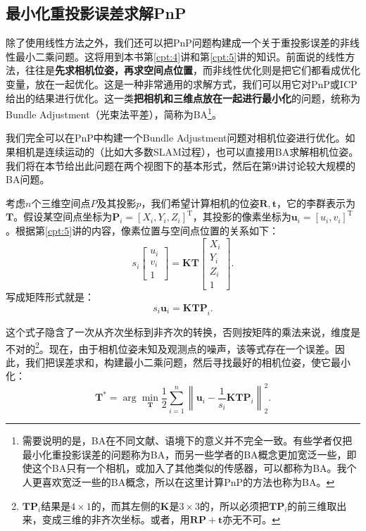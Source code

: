 \subsection{最小化重投影误差求解PnP}
\label{sec:BA-vo1}
除了使用线性方法之外，我们还可以把PnP问题构建成一个关于重投影误差的非线性最小二乘问题。这将用到本书第\ref{cpt:4}讲和第\ref{cpt:5}讲的知识。前面说的线性方法，往往是\textbf{先求相机位姿，再求空间点位置}，而非线性优化则是把它们都看成优化变量，放在一起优化。这是一种非常通用的求解方式，我们可以用它对PnP或ICP给出的结果进行优化。这一类\textbf{把相机和三维点放在一起进行最小化}的问题，统称为Bundle Adjustment（光束法平差），简称为BA\footnote{需要说明的是，BA在不同文献、语境下的意义并不完全一致。有些学者仅把最小化重投影误差的问题称为BA，而另一些学者的BA概念更加宽泛一些，即使这个BA只有一个相机，或加入了其他类似的传感器，可以都称为BA。我个人更喜欢宽泛一些的BA概念，所以在这里计算PnP的方法也称为BA。}。

我们完全可以在PnP中构建一个Bundle Adjustment问题对相机位姿进行优化。如果相机是连续运动的（比如大多数SLAM过程），也可以直接用BA求解相机位姿。我们将在本节给出此问题在两个视图下的基本形式，然后在第9讲讨论较大规模的BA问题。

考虑$n$个三维空间点$P$及其投影$p$，我们希望计算相机的位姿$\bm{R}, \bm{t}$，它的李群表示为$\bm{T}$。假设某空间点坐标为$\bm{P}_i=[X_i,Y_i,Z_i]^\mathrm{T}$，其投影的像素坐标为$\bm{u}_i=[u_i,v_i]^\mathrm{T}$。根据第\ref{cpt:5}讲的内容，像素位置与空间点位置的关系如下：
\begin{equation}
s_i \left[ 
\begin{array}{l}
u_i \\ v_i \\ 1
\end{array}
\right] = \bm{K} \bm{T} \left[ 
\begin{array}{l}
X_i \\ Y_i \\ Z_i \\ 1
\end{array} \right]  .
\end{equation}
写成矩阵形式就是：
\[
{{s_i {\bm{u}}_i} = \bm{K} \bm{T} \bm{P}}_i.
\]

这个式子隐含了一次从齐次坐标到非齐次的转换，否则按矩阵的乘法来说，维度是不对的\footnote{ $ \bm{T} {\bm{P}_i}$结果是$4 \times 1$的，而其左侧的$\bm{K}$是$3 \times 3$的，所以必须把$\bm{T}\bm{P}_i$的前三维取出来，变成三维的非齐次坐标。或者，用$\bm{R}\bm{P}+\bm{t}$亦无不可。}。现在，由于相机位姿未知及观测点的噪声，该等式存在一个误差。因此，我们把误差求和，构建最小二乘问题，然后寻找最好的相机位姿，使它最小化：
\begin{equation}
{\bm{T}^*} = \arg \mathop {\min }\limits_{\bm{T}}  \frac{1}{2}\sum\limits_{i = 1}^n {\left\| {{{\bm{u}}_i} - \frac{1}{s_i} \bm{K}\bm{T}{\bm{P}}_i} \right\|_2^2} .
\end{equation}

